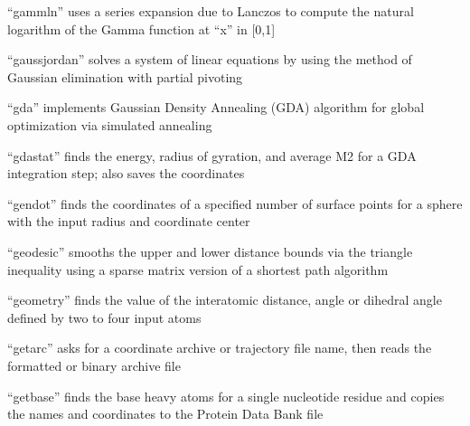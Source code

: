 \documentclass[letterpaper,11pt,english]{sphinxmanual}
\begin{document}
\sphinxAtStartPar
{}

\sphinxAtStartPar
“gammln” uses a series expansion due to Lanczos to compute the natural logarithm of the Gamma function at “x” in {[}0,1{]}

\sphinxAtStartPar
{}

\sphinxAtStartPar
“gaussjordan” solves a system of linear equations by using the method of Gaussian elimination with partial pivoting

\sphinxAtStartPar
{}

\sphinxAtStartPar
“gda” implements Gaussian Density Annealing (GDA) algorithm for global optimization via simulated annealing

\sphinxAtStartPar
{}

\sphinxAtStartPar
{}

\sphinxAtStartPar
{}

\sphinxAtStartPar
{}

\sphinxAtStartPar
“gdastat” finds the energy, radius of gyration, and average M2 for a GDA integration step; also saves the coordinates

\sphinxAtStartPar
{}

\sphinxAtStartPar
“gendot” finds the coordinates of a specified number of surface points for a sphere with the input radius and coordinate center

\sphinxAtStartPar
{}

\sphinxAtStartPar
“geodesic” smooths the upper and lower distance bounds via the triangle inequality using a sparse matrix version of a shortest path algorithm

\sphinxAtStartPar
{}

\sphinxAtStartPar
“geometry” finds the value of the interatomic distance, angle or dihedral angle defined by two to four input atoms

\sphinxAtStartPar
{}

\sphinxAtStartPar
“getarc” asks for a coordinate archive or trajectory file name, then reads the formatted or binary archive file

\sphinxAtStartPar
{}

\sphinxAtStartPar
“getbase” finds the base heavy atoms for a single nucleotide residue and copies the names and coordinates to the Protein Data Bank file
\end{document}
